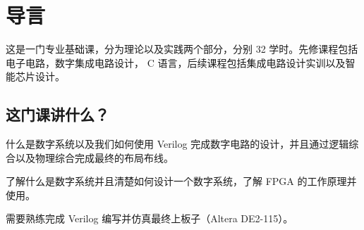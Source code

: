 \documentclass[cn,11pt,chinese,black,simple]{../elegantbook}
\begin{document}
\fi 
\def\chapname{00intro}

\chapter{导言}

这是一门专业基础课，分为理论以及实践两个部分，分别 32 学时。先修课程包括电子电路，数字集成电路设计， C 语言，后续课程包括集成电路设计实训以及智能芯片设计。

\section{这门课讲什么？}

什么是数字系统以及我们如何使用 Verilog 完成数字电路的设计，并且通过逻辑综合以及物理综合完成最终的布局布线。

了解什么是数字系统并且清楚如何设计一个数字系统，了解 FPGA 的工作原理并使用。

需要熟练完成 Verilog 编写并仿真最终上板子（Altera DE2-115）。


\let\chapname\undefined
\ifx\mainclass\undefined
\end{document}
